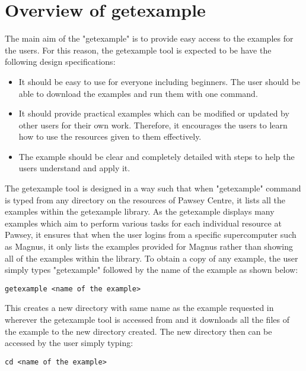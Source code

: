 
\section{Overview of getexample}

The main aim of the "getexample" is to provide easy access to the examples for the users. For this reason, the getexample tool is expected to be have the 
following design specifications:

\begin{itemize}
\item It should be easy to use for everyone including beginners. The user should be able to download the examples and run them with one command.
\item It should provide practical examples which can be modified or updated by other users for their own work. Therefore, it encourages the users to learn
how to use the resources given to them effectively.
\item The example should be clear and completely detailed with steps to help the users understand and apply it.
\end{itemize}

The getexample tool is designed in a way such that when "getexample" command is typed from any directory on the resources of Pawsey Centre, it lists all 
the examples within the getexample library. As the getexample displays many examples which aim to perform various tasks for each individual resource at
Pawsey, it ensures that when the user logins from a specific supercomputer such as Magnus, it only lists the examples provided for Magnus rather than
showing all of the examples within the library. To obtain a copy of any example, the user simply types "getexample" followed by the name of the example 
as shown below:

\begin{tcolorbox}
\begin{verbatim}
getexample <name of the example>
\end{verbatim}
\end{tcolorbox}

This creates a new directory with same name as the example requested in wherever the getexample tool is accessed from and it downloads all the files of
the example to the new directory created. The new directory then can be accessed by the user simply typing:

\begin{tcolorbox}
\begin{verbatim}
cd <name of the example>
\end{verbatim}
\end{tcolorbox}
